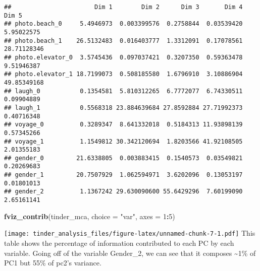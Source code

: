 \documentclass[
]{article}
\newenvironment{Shaded}{\begin{snugshade}}{\end{snugshade}}
\newcommand{\AttributeTok}[1]{\textcolor[rgb]{0.13,0.29,0.53}{#1}}
\newcommand{\CommentTok}[1]{\textcolor[rgb]{0.56,0.35,0.01}{\textit{#1}}}
\newcommand{\ConstantTok}[1]{\textcolor[rgb]{0.56,0.35,0.01}{#1}}
\newcommand{\DecValTok}[1]{\textcolor[rgb]{0.00,0.00,0.81}{#1}}
\newcommand{\FunctionTok}[1]{\textcolor[rgb]{0.13,0.29,0.53}{\textbf{#1}}}
\newcommand{\NormalTok}[1]{#1}
\newcommand{\OtherTok}[1]{\textcolor[rgb]{0.56,0.35,0.01}{#1}}
\newcommand{\SpecialCharTok}[1]{\textcolor[rgb]{0.81,0.36,0.00}{\textbf{#1}}}
\newcommand{\StringTok}[1]{\textcolor[rgb]{0.31,0.60,0.02}{#1}}
\begin{document}
\begin{Shaded}
\end{Shaded}

\begin{verbatim}
##                       Dim 1        Dim 2      Dim 3       Dim 4       Dim 5
## photo.beach_0     5.4946973  0.003399576  0.2758844  0.03539420  5.95022575
## photo.beach_1    26.5132483  0.016403777  1.3312091  0.17078561 28.71128346
## photo.elevator_0  3.5745436  0.097037421  0.3207350  0.59363478  9.51946387
## photo.elevator_1 18.7199073  0.508185580  1.6796910  3.10886904 49.85349168
## laugh_0           0.1354581  5.810312265  6.7772077  6.74330511  0.09904889
## laugh_1           0.5568318 23.884639684 27.8592884 27.71992373  0.40716348
## voyage_0          0.3289347  8.641332018  0.5184313 11.93898139  0.57345266
## voyage_1          1.1549812 30.342120694  1.8203566 41.92108505  2.01355183
## gender_0         21.6338805  0.003883415  0.1540573  0.03549821  0.20269683
## gender_1         20.7507929  1.062594971  3.6202096  0.13053197  0.01801013
## gender_2          1.1367242 29.630090600 55.6429296  7.60199090  2.65161141
\end{verbatim}

\begin{Shaded}
\begin{Highlighting}[]
\FunctionTok{fviz\_contrib}\NormalTok{(tinder\_mca, }\AttributeTok{choice =} \StringTok{"var"}\NormalTok{, }\AttributeTok{axes =} \DecValTok{1}\SpecialCharTok{:}\DecValTok{5}\NormalTok{)}
\end{Highlighting}
\end{Shaded}

\texttt{[image: tinder\_analysis\_files/figure-latex/unnamed-chunk-7-1.pdf]}
This table shows the percentage of information contributed to each PC by
each variable. Going off of the variable Gender\_2, we can see that it
composes \textasciitilde1\% of PC1 but 55\% of pc2's variance.
\end{document}
